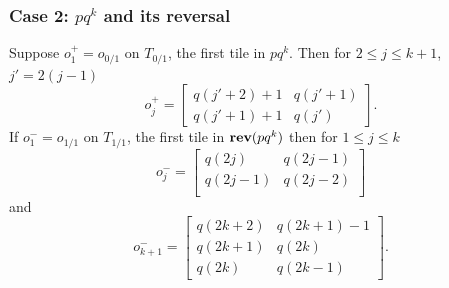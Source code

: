 \documentclass[12pt]{amsart}
\begin{document}
\subsubsection*{Case 2: $p q^{k}$ and its reversal}
Suppose $o_{1}^+ = o_{0/1}$ on $T_{0/1}$, the first tile in $p q^k$. Then for $2 \leq j \leq k+1$, $j' = 2(j-1)$
\begin{equation}\label{eq:explicit-forms-bs-2-a}
o_j^+ = 
\begin{bmatrix}
q(j'+2) +1 & q(j'+1) \\
q(j'+1) +1 & q(j')
\end{bmatrix}.
\end{equation}
If $o_1^{-} = o_{1/1}$ on $T_{1/1}$, the first tile in $\mathop{\bf rev}(p q^k)$ then for $1 \leq j \leq k$
\begin{equation}\label{eq:explicit-forms-bs-2-b}
o_j^- = 
\begin{bmatrix}
q(2 j) & q(2j -1) \\
q(2j-1) & q(2j-2) \\
\end{bmatrix}
\end{equation}
and
\begin{equation}\label{eq:explicit-forms-bs-2-c}
o_{k+1}^- = 
\begin{bmatrix}
q(2k+2) & q(2k+1) - 1\\
q(2k+1) & q(2k) \\
q(2k) & q(2k-1)
\end{bmatrix}.
\end{equation}
\end{document}
